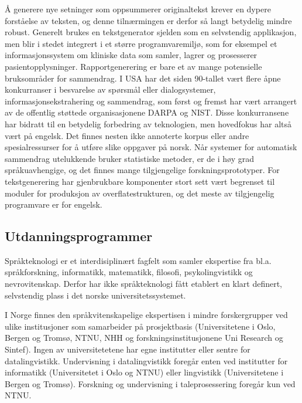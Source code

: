 \begin{multicols}{2}

Å generere nye setninger som oppsummerer originaltekst krever en dypere forståelse av teksten, og denne tilnærmingen er derfor så langt betydelig mindre robust. Generelt brukes en tekstgenerator sjelden som en selvstendig applikasjon, men blir i stedet integrert i et større programvaremiljø, som for eksempel et informasjonssystem om kliniske data som samler, lagrer og prosesserer pasientopplysninger. Rapportgenerering er bare et av mange potensielle bruksområder for sammendrag.
I USA har det siden 90-tallet vært flere åpne konkurranser i besvarelse av spørsmål eller dialogsystemer, informasjonsekstrahering og sammendrag, som først og fremst har vært arrangert av de offentlig støttede organisasjonene DARPA og NIST. Disse konkurransene har bidratt til en betydelig forbedring av teknologien, men hovedfokus har altså vært på engelsk. 
Det finnes nesten ikke annoterte korpus eller andre spesialressurser for å utføre slike oppgaver på norsk. 
Når systemer for automatisk sammendrag utelukkende bruker statistiske metoder, er de i høy grad språkuavhengige, og det finnes mange tilgjengelige forskningsprototyper. 
For tekstgenerering har gjenbrukbare komponenter stort sett vært begrenset til moduler for produksjon av overflatestrukturen, og det meste av tilgjengelig programvare er for engelsk. 

\subsection{Utdanningsprogrammer}

Språkteknologi er et interdisiplinært fagfelt som samler ekspertise fra bl.a. språkforskning, informatikk, matematikk, filosofi, psykolingvistikk og nevrovitenskap.
Derfor har ikke språkteknologi fått etablert en klart definert, selvstendig plass i det norske universitetssystemet. 

I Norge finnes den språkvitenskapelige ekspertisen i mindre forskergrupper ved ulike institusjoner som samarbeider på prosjektbasis (Universitetene i Oslo, Bergen og Tromsø, NTNU, NHH og forskningsinstitusjonene Uni Research og Sintef). Ingen av universitetetene har egne institutter eller sentre for datalingvistikk. Undervisning i datalingvistikk foregår enten ved institutter for informatikk (Universitetet i Oslo og NTNU) eller lingvistikk (Universitetene i Bergen og Tromsø). Forskning og undervisning i taleprosessering foregår kun ved NTNU.


\end{multicols}
